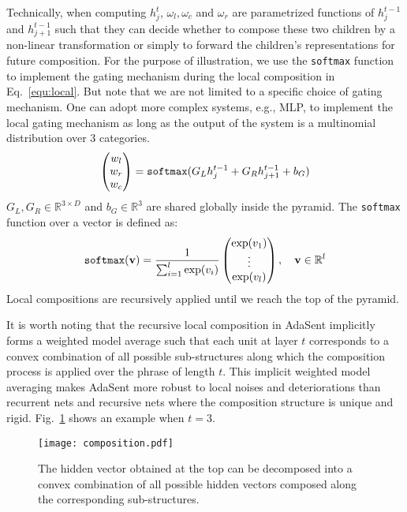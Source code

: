\documentclass{article}
\newcommand{\RR}{\mathbb{R}}
\theoremstyle{definition}
\begin{document}
Technically, when computing $h_j^t$, $\omega_l, \omega_c$ and $\omega_r$ are parametrized functions of $h_j^{t-1}$ and $h_{j+1}^{t-1}$ such that they can decide whether to compose these two children by a non-linear transformation or simply to forward the children's representations for future composition. For the purpose of illustration, we use the \texttt{softmax} function to implement the gating mechanism during the local composition in Eq.~\ref{equ:local}. But note that we are not limited to a specific choice of gating mechanism. One can adopt more complex systems, e.g., MLP, to implement the local gating mechanism as long as the output of the system is a multinomial distribution over 3 categories.
\begin{equation}
\label{equ:local}
\begin{pmatrix}
w_l \\ w_r \\ w_c
\end{pmatrix} = \text{\texttt{softmax}}(G_L h_j^{t-1} + G_R h_{j+1}^{t-1} + b_G)
\end{equation}
$G_L, G_R\in\RR^{3\times D}$ and $b_G\in\RR^{3}$ are shared globally inside the pyramid. The \texttt{softmax} function over a vector is defined as:
\begin{equation} 
\text{\texttt{softmax}}(\mathbf{v}) = \frac{1}{\sum_{i=1}^l\exp(v_i)}
\begin{pmatrix} 
\exp(v_1) \\ \vdots \\ \exp(v_l)
\end{pmatrix}, \quad \mathbf{v}\in\RR^l
\end{equation}
Local compositions are recursively applied until we reach the top of the pyramid.

It is worth noting that the recursive local composition in AdaSent implicitly forms a weighted model average such that each unit at layer $t$ corresponds to a convex combination of all possible sub-structures along which the composition process is applied over the phrase of length $t$. This implicit weighted model averaging makes AdaSent more robust to local noises and deteriorations than recurrent nets and recursive nets where the composition structure is unique and rigid. Fig.~\ref{fig:composition} shows an example when $t=3$. 
\begin{figure}[htb]
\centering
	\texttt{[image: composition.pdf]}
\caption{The hidden vector obtained at the top can be decomposed into a convex combination of all possible hidden vectors composed along the corresponding sub-structures.}
\label{fig:composition}
\end{figure}
\end{document}
